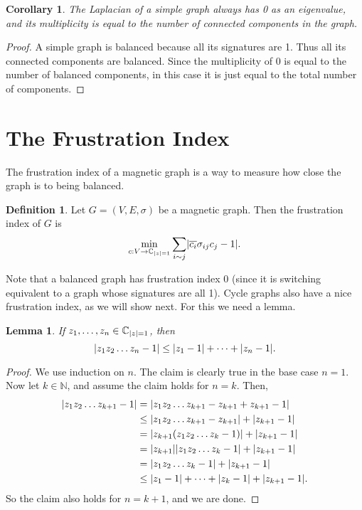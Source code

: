 \documentclass[12pt]{article}
\newtheorem{corollary}[thm]{Corollary}
\newtheorem{lem}[thm]{Lemma}
\theoremstyle{definition}
\newtheorem{defn}[thm]{Definition}
\newcommand{\N}{\mathbb N}
\newcommand{\C}{\mathbb C}
\DeclarePairedDelimiter\abs{\lvert}{\rvert}%
\begin{document}
\begin{corollary}
The Laplacian of a simple graph always has 0 as an eigenvalue, and its multiplicity is equal to the number of connected components in the graph.
\end{corollary}
\begin{proof}
A simple graph is balanced because all its signatures are 1. Thus all its connected components are balanced. Since the multiplicity of 0 is equal to the number of balanced components, in this case it is just equal to the total number of components.
\end{proof}



\section{The Frustration Index}
The frustration index of a magnetic graph is a way to measure how close the graph is to being balanced.

\begin{defn}
Let $G = (V, E, \sigma)$ be a magnetic graph. Then the frustration index of $G$ is 
$$
\min_{c: V \rightarrow \C_{\abs*z = 1}}
\sum_{i \sim j} 
\abs*{\overline{c_i} \sigma_{ij} c_j - 1}.
$$
\end{defn}

Note that a balanced graph has frustration index 0 (since it is switching equivalent to a graph whose signatures are all 1). Cycle graphs also have a nice frustration index, as we will show next. For this we need a lemma.

\begin{lem}\label{lemma for cycle frustration}
If $z_1, \dots, z_n \in \C_{\abs*z = 1}$, then
$$
\abs*{z_1 z_2 \dots z_n - 1} \leq \abs*{z_1 - 1} + \dots + \abs*{z_n - 1}.
$$
\end{lem}
\begin{proof}
We use induction on $n$. The claim is clearly true in the base case $n = 1$. Now let $k \in \N$, and assume the claim holds for $n = k$. Then,
\begin{align*}
\abs*{z_1 z_2 \dots z_{k+1} - 1}
&= \abs*{z_1 z_2 \dots z_{k+1} - z_{k+1} + z_{k+1} - 1} \\
&\leq \abs*{z_1 z_2 \dots z_{k+1} - z_{k+1}} + \abs*{z_{k+1} - 1}\\
&= \abs*{z_{k+1}(z_1 z_2 \dots z_{k} - 1)} + \abs*{z_{k+1} - 1} \\
&= \abs*{z_{k+1}} \abs*{z_1 z_2 \dots z_{k} - 1} + \abs*{z_{k+1} - 1} \\
&= \abs*{z_1 z_2 \dots z_{k} - 1} + \abs*{z_{k+1} - 1} \\
&\leq \abs*{z_1 - 1} + \dots + \abs*{z_k - 1} + \abs*{z_{k+1} - 1}.
\end{align*}
So the claim also holds for $n = k + 1$, and we are done.
\end{proof}
\end{document}
